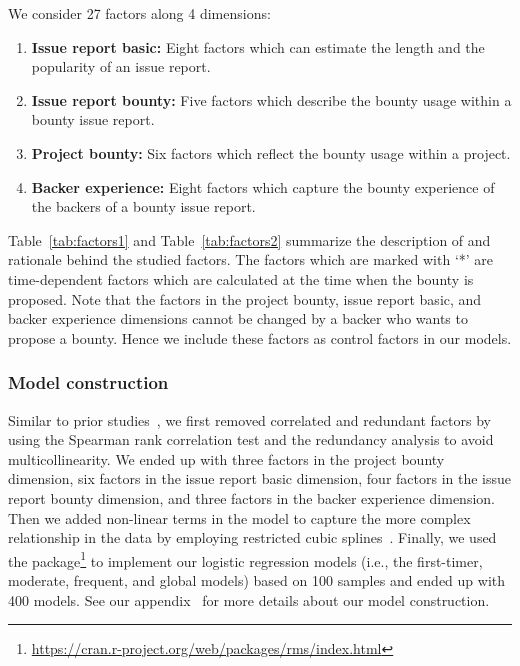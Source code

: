 \begin{table}[ ]
\begin{tabular}{p{10em}p{29em}p{21em}}
     \end{tabular}%
\vspace{-0.2in}
 \end{table}%

We consider 27 factors along 4 dimensions:
\begin{enumerate}
    \item \textbf{Issue report basic:} Eight factors which can estimate the length and the popularity of an issue report.
    \item \textbf{Issue report bounty:} Five factors which describe the bounty usage within a bounty issue report.
    \item \textbf{Project bounty:} Six factors which reflect the bounty usage within a project.
    \item  \textbf{Backer experience:}  Eight factors which capture the bounty experience of the backers of a bounty issue report.
\vspace{-0.01in}
\end{enumerate}

Table~\ref{tab:factors1} and Table~\ref{tab:factors2} summarize the description of and rationale behind the studied factors. The factors which are marked with `*' are time-dependent factors which are calculated at the time when the bounty is proposed.
Note that the factors in the project bounty, issue report basic, and backer experience dimensions cannot be changed by a backer who wants to propose a bounty. Hence we include these factors as control factors in our models.



\subsubsection{Model construction}
Similar to prior studies~\cite{gopi:2017,wang2017understanding,mcintosh2016empirical,kabinna2018examining}, we first removed correlated and redundant factors by using the Spearman rank correlation test and the redundancy analysis to avoid multicollinearity. We ended up with three factors in the project bounty dimension, six factors in the issue report basic dimension, four factors in the issue report bounty dimension, and three factors in the backer experience dimension.
Then we added non-linear terms in the model to capture the more complex relationship in the data by employing restricted cubic splines~\cite{Harrell:2006}.
Finally, we used the   package\footnote{\url{https://cran.r-project.org/web/packages/rms/index.html}} to implement our logistic regression models (i.e., the first-timer, moderate, frequent, and global models) based on 100 samples and ended up with 400 models. See our appendix~\cite{appendix} for more details about our model construction.

